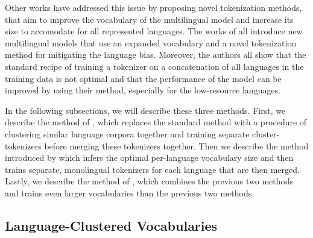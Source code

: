 Other works have addressed this issue by proposing novel tokenization methods, that aim to improve the vocabulary of the multilingual model and increase its size to accomodate for all represented languages. The works of \citet{chung_improving_2020,zheng_allocating_2021,liang_xlm-v_2023} all introduce new multilingual models that use an expanded vocabulary and a novel tokenization method for mitigating the language bias. Moreover, the authors all show that the standard recipe of training a tokenizer on a concatenation of all languages in the training data is not optimal and that the performance of the model can be improved by using their method, especially for the low-resource languages.

In the following subsections, we will describe these three methods. First, we describe the method of \citet{chung_improving_2020}, which replaces the standard method with a procedure of clustering similar language corpora together and training separate cluster-tokenizers before merging these tokenizers together. Then we describe the method introduced by \citet{zheng_allocating_2021} which infers the optimal per-language vocabulary size and then trains separate, monolingual tokenizers for each language that are then merged. Lastly, we describe the method of \citet{liang_xlm-v_2023}, which combines the previous two methods and trains even larger vocabularies than the previous two methods.



\subsection{Language-Clustered Vocabularies}
\label{sec:chung}

